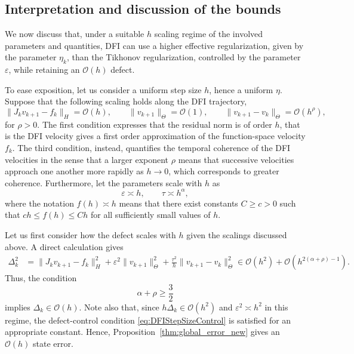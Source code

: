 \documentclass[oneside,11pt]{article}
\theoremstyle{remark}
\theoremstyle{thmstyleone}
\theoremstyle{thmstylethree}
\theoremstyle{thmstyletwo}
\newcommand{\norm}[1]{\lVert #1\rVert}
\newcommand{\tc}[1]{#1}
\begin{document}
\subsection{Interpretation and discussion of the bounds}
\tc{
  We now discuss that, under a suitable $h$ scaling regime of the involved parameters and quantities, DFI can use a higher effective regularization, given by the parameter $\eta_k$, than the Tikhonov regularization, controlled by the parameter $\varepsilon$, while retaining an $\mathcal{O}(h)$ defect.
  
  To ease exposition, let us consider a uniform step size $h$, hence a uniform $\eta$. 
  Suppose that the following scaling holds along the DFI trajectory,
  \begin{equation}
    \norm{J_kv_{k+1}-f_k}_H=\mathcal{O}(h),
    \qquad
    \norm{v_{k+1}}_\Theta=\mathcal{O}(1),
    \qquad
    \norm{v_{k+1}-v_k}_\Theta=\mathcal{O}(h^\rho),
  \end{equation}
  for $\rho > 0$. 
  The first condition expresses that the residual norm is of order $h$, that is the DFI velocity gives a first order approximation of the function-space velocity $f_k$. 
  The third condition, instead, quantifies the temporal coherence of the DFI velocities in the sense that a larger exponent $\rho$ means that successive velocities approach one another more rapidly as $h\to0$, which corresponds to greater coherence. 
  Furthermore, let the parameters scale with $h$ as
  \begin{equation}
    \varepsilon\asymp h,
    \qquad
    \tau\asymp h^\alpha,
  \end{equation}
  where the notation $f(h) \asymp h$ means that there exist constants $C \geq c > 0$ such that $ch \leq f(h) \leq Ch$ for all sufficiently small values of $h$.
  
  Let us first consider how the defect scales with $h$ given the scalings discussed above. A direct calculation gives
  \begin{align*}
    \Delta_k^2
     & =
    \norm{J_kv_{k+1}-f_k}_H^2
    +
    \varepsilon^2\norm{v_{k+1}}_\Theta^2
    +
    \frac{\tau^2}{h}\norm{v_{k+1}-v_k}_\Theta^2
     \in 
    \mathcal{O}(h^2)+\mathcal{O}\left(h^{2(\alpha+\rho)-1}\right).
  \end{align*}
  Thus, the condition
  \begin{equation} \label{eq:cond_alpha_rho}
    \alpha+\rho\geq\frac{3}{2}
  \end{equation}
  implies $\Delta_k\in \mathcal{O}(h)$.
  Note also that, since $h\Delta_k\in\mathcal{O}(h^2)$ and $\varepsilon^2\asymp h^2$ in this regime, the defect-control condition \eqref{eq:DFIStepSizeControl} is satisfied for an appropriate constant. 
  Hence, Proposition~\ref{thm:global_error_new} gives an $\mathcal{O}(h)$ state error.

}
\end{document}
